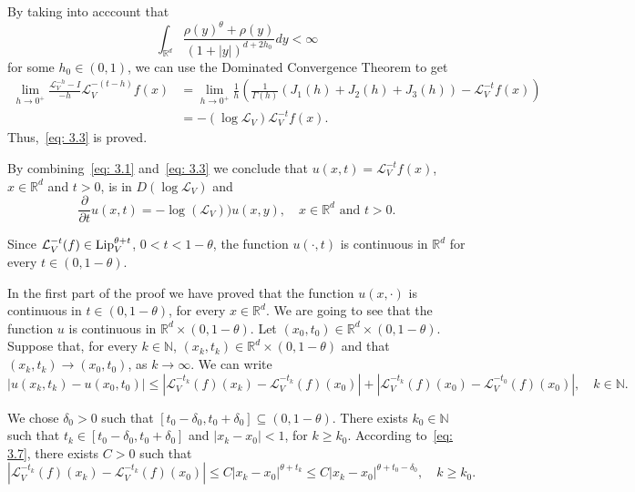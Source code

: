 \documentclass[10pt, a4paper, reqno]{amsart}
\theoremstyle{definition}
\theoremstyle{remark}
\newcommand{\RR}{\mathbb{R}}
\newcommand{\NN}{\mathbb{N}}
\numberwithin{equation}{section}
\begin{document}
By taking into acccount that
\begin{equation*}
    \int_{\RR^d} \frac{\rho(y)^\theta + \rho(y)}{(1+|y|)^{d+2h_0}} dy < \infty 
\end{equation*}
for some $h_0\in(0,1)$,
we can use the Dominated Convergence Theorem to get
\begin{equation*}
    \begin{split}
        \lim_{h\rightarrow 0^+} \frac{\mathcal{L}_V^{-h} - I}{-h}\mathcal{L}_V^{-(t-h)} f(x) & = \lim_{h\rightarrow 0^+} \frac{1}{h} \left( \frac{1}{\Gamma(h)} \left( J_1(h) + J_2(h) + J_3(h) \right) - \mathcal{L}_V^{-t} f(x)\right)
        \\ & = -(\log \mathcal{L}_V) \mathcal{L}_V^{-t} f(x).
    \end{split}
\end{equation*}
Thus,~\eqref{eq: 3.3} is proved.

By combining~\eqref{eq: 3.1} and~\eqref{eq: 3.3} we conclude that $u(x,t) = \mathcal{L}_V^{-t} f(x)$, $x\in \RR^d$ and $t>0$, is in $D(\log \mathcal{L}_V)$ and 
\begin{equation*}
    \frac{\partial}{\partial t} u(x,t) = -\log(\mathcal{L}_V)) u(x,y),\quad x\in \RR^d \text{ and } t>0.
\end{equation*}

Since $\mathcal{L}_V^{-t}(f)\in \textup{Lip}_V^{\theta +t}$, $0<t<1-\theta$, the function $u(\cdot, t)$ is continuous in $\RR^d$ for every $t\in (0,1-\theta)$. 

In the first part of the proof we have proved that the function $u(x,\cdot)$ is continuous in $t\in(0,1-\theta)$, for every $x\in \RR^d$. We are going to see that the function $u$ is continuous in $\RR^d\times (0,1-\theta)$. Let $(x_0,t_0)\in \RR^d\times (0,1-\theta)$.  Suppose that, for every $k\in \NN$, $(x_k,t_k)\in \RR^d\times (0,1-\theta)$ and that $(x_k,t_k)\rightarrow (x_0,t_0)$, as $k\rightarrow \infty$. We can write
\begin{equation*}
    |u(x_k,t_k) - u(x_0,t_0)| \leq 
    | \mathcal{L}_V^{-t_k}(f)(x_k) - \mathcal{L}_V^{-t_k}(f)(x_0)| + |\mathcal{L}_V^{-t_k}(f)(x_0) - \mathcal{L}_V^{-t_0}(f)(x_0)|, \quad k\in\NN.
\end{equation*}

We chose $\delta_0>0$ such that $[t_0 - \delta_0,t_0+ \delta_0]\subseteq (0,1-\theta)$. There exists $k_0\in \NN$ such that $t_k \in [t_0-\delta_0, t_0+\delta_0]$ and $|x_k-x_0|<1$, for $k\geq k_0$. According to~\eqref{eq: 3.7}, there exists $C>0$ such that
\begin{equation}\label{eq: 3.8}
    |\mathcal{L}_V^{-t_k}(f)(x_k) - \mathcal{L}_V^{-t_{k}} (f)(x_0) | \leq C |x_k - x_0|^{\theta + t_k} \leq C |x_k - x_0|^{\theta+t_0-\delta_0}, \quad k\geq k_0.
\end{equation}
\end{document}
